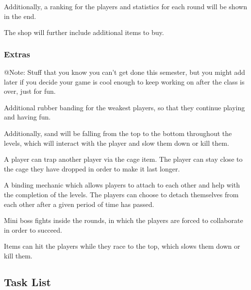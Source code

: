 Additionally, a ranking for the players and statistics for each round will be shown in the end.

The shop will further include additional items to buy.

\subsubsection{Extras}

\begin{TempText}
	@Note: Stuff that you know you can't get done this semester, but you might add later if you decide your game is cool enough to keep working on after the class is over, just for fun.
\end{TempText}

Additional rubber banding for the weakest players, so that they continue playing and having fun.

Additionally, sand will be falling from the top to the bottom throughout the levels, which will interact with the player and slow them down or kill them.

A player can trap another player via the cage item. The player can stay close to the cage they have dropped in order to make it last longer.

A binding mechanic which allows players to attach to each other and help with the completion of the levels. The players can choose to detach themselves from each other after a given period of time has passed.

Mini boss fights inside the rounds, in which the players are forced to collaborate in order to succeed.

Items can hit the players while they race to the top, which slows them down or kill them.

\subsection{Task List}


        
    
